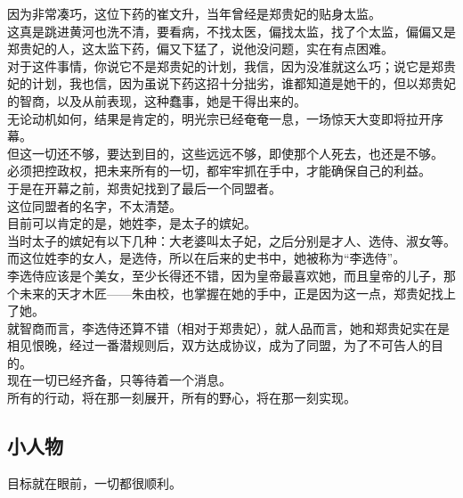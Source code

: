 \begin{multicols}{\theparacolNo}
因为非常凑巧，这位下药的崔文升，当年曾经是郑贵妃的贴身太监。\\

这真是跳进黄河也洗不清，要看病，不找太医，偏找太监，找了个太监，偏偏又是郑贵妃的人，这太监下药，偏又下猛了，说他没问题，实在有点困难。\\

对于这件事情，你说它不是郑贵妃的计划，我信，因为没准就这么巧；说它是郑贵妃的计划，我也信，因为虽说下药这招十分拙劣，谁都知道是她干的，但以郑贵妃的智商，以及从前表现，这种蠢事，她是干得出来的。\\

无论动机如何，结果是肯定的，明光宗已经奄奄一息，一场惊天大变即将拉开序幕。\\

但这一切还不够，要达到目的，这些远远不够，即使那个人死去，也还是不够。\\

必须把控政权，把未来所有的一切，都牢牢抓在手中，才能确保自己的利益。\\

于是在开幕之前，郑贵妃找到了最后一个同盟者。\\

这位同盟者的名字，不太清楚。\\

目前可以肯定的是，她姓李，是太子的嫔妃。\\

当时太子的嫔妃有以下几种：大老婆叫太子妃，之后分别是才人、选侍、淑女等。\\

而这位姓李的女人，是选侍，所以在后来的史书中，她被称为“李选侍”。\\

李选侍应该是个美女，至少长得还不错，因为皇帝最喜欢她，而且皇帝的儿子，那个未来的天才木匠——朱由校，也掌握在她的手中，正是因为这一点，郑贵妃找上了她。\\

就智商而言，李选侍还算不错（相对于郑贵妃），就人品而言，她和郑贵妃实在是相见恨晚，经过一番潜规则后，双方达成协议，成为了同盟，为了不可告人的目的。\\

现在一切已经齐备，只等待着一个消息。\\

所有的行动，将在那一刻展开，所有的野心，将在那一刻实现。\\

\subsection{小人物}
目标就在眼前，一切都很顺利。\\


\end{multicols}
